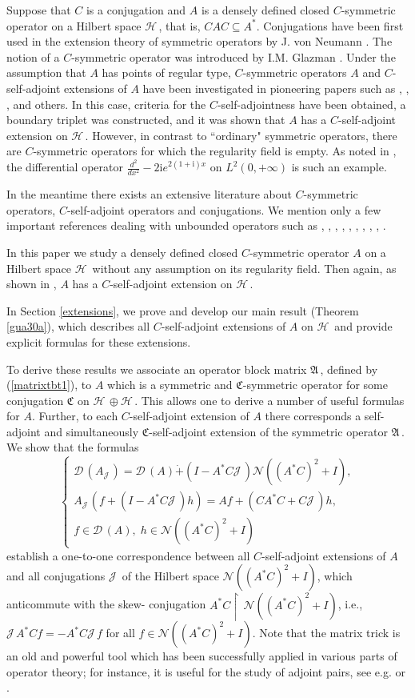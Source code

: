 \documentclass[12pt]{amsart}
\newcommand{\ii}{\mathrm{i}}
\theoremstyle{definition}
\newcommand{\cJ}{\mathcal{J}\,}
\newcommand{\gA}{\mathfrak{A}\,}
\newcommand{\cD}{\mathcal{D}\,}
\newcommand{\cH}{\mathcal{H}\,}
\newcommand{\cN}{\mathcal{N}}
\newcommand{\gC}{\mathfrak{C}}
\def\uphar{{\upharpoonright\,}}
\begin{document}
Suppose that $C$ is a conjugation and $A$ is a densely defined closed $C$-symmetric operator on a Hilbert space $\cH$, that is, $CAC\subseteq A^*$.  Conjugations have been first used in the  extension theory of symmetric operators by J. von Neumann \cite{vN}. The notion of a $C$-symmetric operator was introduced by I.M. Glazman \cite{glazman}. Under the assumption that $A$ has points of regular type, $C$-symmetric operators $A$ and $C$-self-adjoint extensions of $A$ have been investigated  in pioneering papers such as \cite{zh}, \cite{kochubei}, \cite{knowles}, and others. In this case, criteria for the $C$-self-adjointness have been obtained, a boundary triplet was constructed, and it was shown that $A$ has a $C$-self-adjoint extension on $\cH$. However, in contrast to ``ordinary" symmetric operators, there are $C$-symmetric operators for which the regularity field is empty. As noted in \cite[Example 5.6]{race}, the differential operator $\frac{d^2}{dx^2}- 2\ii  e^{2(1+\ii) x}$ on $L^2(0,+\infty)$ is such an example.

In the meantime there exists an extensive literature about $C$-symmetric operators, $C$-self-adjoint operators and conjugations. We mention only a few important references dealing with unbounded operators such as \cite{zh}, \cite{galindo},  \cite{kochubei}, \cite{knowles80}, \cite{knowles}, \cite{race}, \cite{raikh_tsek}, \cite{EdEv}, \cite{brown}, \cite{camara}.

In this paper we study a densely defined closed $C$-symmetric operator $A$ on a Hilbert space $\cH$ without any assumption on its regularity field. Then again, as shown in \cite{galindo}, $A$ has  a $C$-self-adjoint extension on $\cH$.

In Section \ref{extensions}, we prove and develop  our main result (Theorem \ref{gua30a}), which describes all $C$-self-adjoint extensions of $A$ on $\cH$ and provide explicit formulas for these extensions.

To derive these results we associate an operator block matrix $\gA$, defined by (\ref{matrixtbt1}),  to $A$ which is a symmetric and $\gC$-symmetric operator for some conjugation $\gC$ on $\cH\oplus \cH$. This allows one to derive a  number of useful formulas for $A$. Further, to each  $C$-self-adjoint extension of $A$ there corresponds a self-adjoint and simultaneously  $\gC$-self-adjoint extension of the symmetric operator $\gA$. We show
that the formulas
\[
\left\{\begin{array}{l}  \cD(A_{\cJ})=\cD(A)\dot+(I-A^*C \cJ)\cN((A^*C)^2+I),\\[2mm]
A_{\cJ} (f+(I-A^*C \cJ)h)=Af+(CA^*C+C\cJ)h,\\[2mm]
 f\in\cD(A),\; h\in\cN( (A^*C)^2+I)
\end{array}\right.
\]
establish a
 one-to-one correspondence between all $C$-self-adjoint extensions of $A$ and all conjugations $\cJ$ of the Hilbert space $\cN((A^*C)^2+I)$, which anticommute with the skew- conjugation $A^*C\uphar\cN((A^*C)^2+I)$, i.e., $\cJ A^*Cf=-A^*C\cJ f$ for all $f\in \cN((A^*C)^2+I)$.
Note that the matrix trick is an old and powerful tool which has been successfully applied in various  parts of  operator theory; for instance, it is useful for the study of adjoint pairs, see   e.g.
\cite{brown} or \cite{sch22}.
\end{document}
